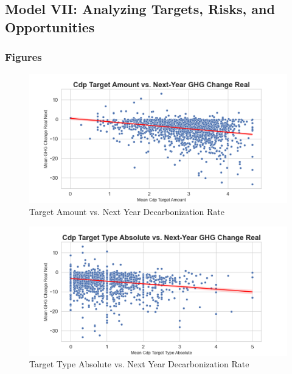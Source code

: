 \subsection{Model VII: Analyzing Targets, Risks, and Opportunities}



\subsubsection{Figures}

\begin{figure}[H]
\centering
  \includegraphics[width=\textwidth]{figures/cdp_target_amount_vs_ghg_change_real_next.png}
\caption{Target Amount vs. Next Year Decarbonization Rate}
\label{fig:cdp_target_amount_vs_ghg_change_real_next}
\end{figure}

\begin{figure}[H]
\centering
  \includegraphics[width=\textwidth]{figures/cdp_target_type_absolute_vs_ghg_change_real_next.png}
\caption{Target Type Absolute vs. Next Year Decarbonization Rate}
\label{fig:cdp_target_type_absolute_vs_ghg_change_real_next}
\end{figure}

